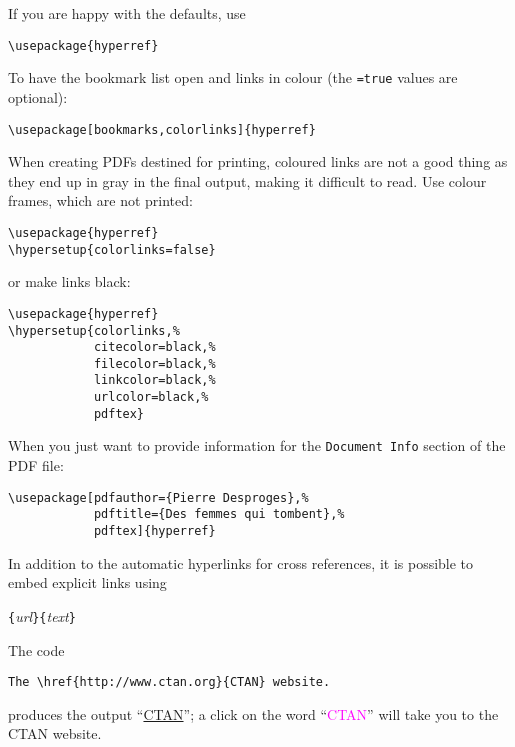 If you are happy with the defaults, use
\begin{code}
\begin{verbatim}
\usepackage{hyperref}
\end{verbatim}
\end{code}

To have the bookmark list open and links in colour
(the \texttt{=true} values are optional):
\begin{code}
\begin{verbatim}
\usepackage[bookmarks,colorlinks]{hyperref}
\end{verbatim}
\end{code}

When creating PDFs destined for printing, coloured links are not a
  good thing as they end up in gray in the final output, making it
  difficult to read. Use colour frames, which are not printed:
\begin{code}
\begin{verbatim}
\usepackage{hyperref}
\hypersetup{colorlinks=false}
\end{verbatim}
\end{code}
\noindent or make links black:
\begin{code}
\begin{verbatim}
\usepackage{hyperref}
\hypersetup{colorlinks,%
            citecolor=black,%
            filecolor=black,%
            linkcolor=black,%
            urlcolor=black,%
            pdftex}
\end{verbatim}
\end{code}

When you just want to provide information for the
  \texttt{Document Info} section of the PDF file:
\begin{code}
\begin{verbatim}
\usepackage[pdfauthor={Pierre Desproges},%
            pdftitle={Des femmes qui tombent},%
            pdftex]{hyperref}
\end{verbatim}
\end{code}

\vspace{\baselineskip}

In addition to the automatic hyperlinks for cross references, it is
possible to embed explicit links using
\begin{lscommand}
\verb|{|\emph{url}\verb|}{|\emph{text}\verb|}|
\end{lscommand}

The code
\begin{code}
\begin{verbatim}
The \href{http://www.ctan.org}{CTAN} website.
\end{verbatim}
\end{code}
produces the output ``\href{http://www.ctan.org}{CTAN}'';
a click on the word ``\textcolor{magenta}{CTAN}''
will take you to the CTAN website.

